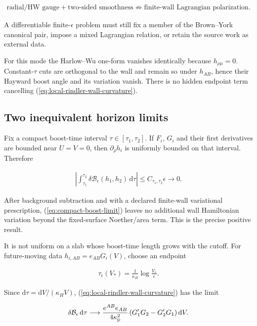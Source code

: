\begin{align}
\text{radial/HW gauge}+\text{two-sided smoothness}
\not\Longrightarrow
\text{finite-wall Lagrangian polarization}.
\end{align}

A differentiable finite-$\epsilon$ problem must still fix a member of the Brown--York canonical pair, impose a mixed Lagrangian relation, or retain the source work as external data.

For this mode the Harlow--Wu one-form vanishes identically because $h_{\rho\mu}=0$. Constant-$\tau$ cuts are orthogonal to the wall and remain so under $h_{AB}$, hence their Hayward boost angle and its variation vanish. There is no hidden endpoint term cancelling (\ref{eq:local-rindler-wall-curvature}).

\subsection{Two inequivalent horizon limits}\label{subsec:rindler-horizon-limits}

Fix a compact boost-time interval $\tau\in[\tau_1,\tau_2]$. If $F_i$, $G_i$ and their first derivatives are bounded near $U=V=0$, then $\partial_\rho h_i$ is uniformly bounded on that interval. Therefore

\begin{align}
\left|
\int_{\tau_1}^{\tau_2}\delta\mathcal B_\epsilon(h_1,h_2)
\,\mathrm d\tau
\right|
\leq C_{\tau_1,\tau_2}\epsilon
\longrightarrow0.
\label{eq:compact-boost-limit}
\end{align}

After background subtraction and with a declared finite-wall variational prescription, (\ref{eq:compact-boost-limit}) leaves no additional wall Hamiltonian variation beyond the fixed-surface Noether/area term. This is the precise positive result.

It is not uniform on a slab whose boost-time length grows with the cutoff. For future-moving data $h_{i,AB}=e_{AB}G_i(V)$, choose an endpoint

\begin{align}
\tau_\epsilon(V_*)=\frac1{\kappa_H}\log\frac{V_*}{\epsilon}.
\end{align}

Since $\mathrm d\tau=\mathrm dV/(\kappa_HV)$, (\ref{eq:local-rindler-wall-curvature}) has the limit

\begin{align}
\delta\mathcal B_\epsilon\,\mathrm d\tau
\longrightarrow
\frac{e^{AB}e_{AB}}{4\kappa_{\rm p}^2}
\left(G_1'G_2-G_2'G_1\right)\mathrm dV.
\label{eq:future-null-limit}
\end{align}

